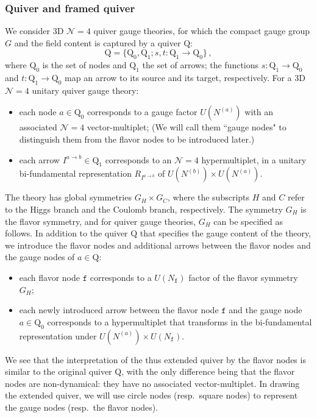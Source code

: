 \documentclass[12pt,a4paper]{article}
\renewcommand{\(}{\left(}
\renewcommand{\)}{\right)}
\renewcommand{\(}{\left(}
\renewcommand{\)}{\right)}
\begin{document}
\subsubsection{Quiver and framed quiver}
We consider 3D $\mathcal{N}=4$  quiver gauge theories, for which the compact gauge group $G$ and the field content is captured by a quiver $\textrm{Q}$:
\begin{equation}
\textrm{Q}=\{\textrm{Q}_0,\textrm{Q}_1;s,t:\textrm{Q}_1\to \textrm{Q}_0\}\,,
\end{equation}
where $\textrm{Q}_0$ is the set of nodes and $\textrm{Q}_1$ the set of arrows; the functions $s:\textrm{Q}_1\to \textrm{Q}_0$ and $t:\textrm{Q}_1\to \textrm{Q}_0$ map an arrow to its source and its target, respectively. 
For a 3D $\mathcal{N}=4$ unitary quiver gauge theory:
\begin{itemize}
\item each node $a\in \textrm{Q}_0$ corresponds to a gauge factor $U(N^{(a)})$
with an associated $\mathcal{N}=4$ vector-multiplet; (We will call them ``gauge nodes" to distinguish them from the flavor nodes to be introduced later.)
\item each  arrow $I^{a\rightarrow b}\in \textrm{Q}_1$ corresponds to an $\mathcal{N}=4$ hypermultiplet, in a unitary bi-fundamental representation $R_{I^{a\rightarrow b}}$ of $U(N^{(b)})\times U(N^{(a)})$.
\end{itemize}


\medskip

The theory has global symmetries $G_H\times G_C$, where the subscripts $H$ and $C$ refer to the Higgs branch and the Coulomb branch, respectively. 
The symmetry $G_H$ is the  flavor symmetry, and for quiver gauge theories, $G_H$ can be specified as follows. 
In addition to the quiver $\mathrm{Q}$ that specifies the gauge content of the theory, we introduce the flavor nodes and additional arrows between the flavor nodes and the gauge nodes of $a\in \mathrm{Q}$: 
\begin{itemize}
\item each flavor node $\mathtt{f}$ corresponds to a $U(N_{\mathtt{f}})$ factor of the flavor symmetry $G_H$;
\item each newly introduced arrow between the flavor node $\mathtt{f}$ and the gauge node $a\in \mathrm{Q}_0$ corresponds to a hypermultiplet that transforms in the bi-fundamental representation under $U(N^{(a)})\times U(N_{\mathtt{f}})$.
\end{itemize}
We see that the interpretation of the thus extended quiver by the flavor nodes is similar to the original quiver $\mathrm{Q}$, with the only difference being that the flavor nodes are non-dynamical: they have no associated vector-multiplet. 
In drawing the extended quiver, we will use circle nodes (resp.\ square nodes) to represent  the gauge nodes (resp.\ the flavor nodes).
\end{document}

